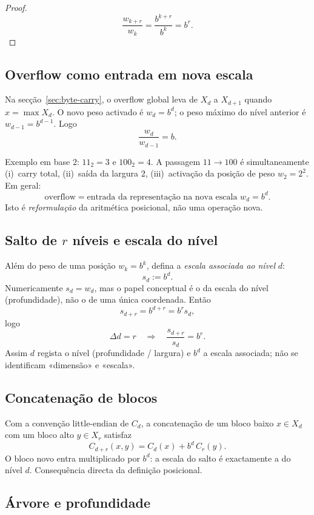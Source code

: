 \documentclass[11pt,a4paper]{article}
\begin{document}
\begin{proof}
\[
\frac{w_{k+r}}{w_k}=\frac{b^{k+r}}{b^k}=b^r.
\]
\end{proof}

\subsection{Overflow como entrada em nova escala}

Na secção~\ref{sec:byte-carry}, o overflow global leva de \(X_d\) a \(X_{d+1}\) quando \(x=\max X_d\). O novo peso activado é \(w_d=b^d\); o peso máximo do nível anterior é \(w_{d-1}=b^{d-1}\). Logo
\[
\frac{w_d}{w_{d-1}}=b.
\]

Exemplo em base \(2\): \(11_2=3\) e \(100_2=4\). A passagem \(11\to 100\) é simultaneamente (i)~carry total, (ii)~saída da largura \(2\), (iii)~activação da posição de peso \(w_2=2^2\). Em geral:
\[
\boxed{\text{overflow}=\text{entrada da representação na nova escala }w_d=b^d}.
\]
Isto é \emph{reformulação} da aritmética posicional, não uma operação nova.

\subsection{Salto de \(r\) níveis e escala do nível}

Além do peso de uma posição \(w_k=b^k\), defina a \emph{escala associada ao nível} \(d\):
\[
s_d:=b^d.
\]
Numericamente \(s_d=w_d\), mas o papel conceptual é o da escala do nível (profundidade), não o de uma única coordenada. Então
\[
s_{d+r}=b^{d+r}=b^r s_d,
\]
logo
\[
\boxed{\Delta d=r\quad\Longrightarrow\quad\frac{s_{d+r}}{s_d}=b^r}.
\]
Assim \(d\) regista o nível (profundidade / largura) e \(b^d\) a escala associada; não se identificam «dimensão» e «escala».

\subsection{Concatenação de blocos}

Com a convenção little-endian de \(C_d\), a concatenação de um bloco baixo \(x\in X_d\) com um bloco alto \(y\in X_r\) satisfaz
\[
C_{d+r}(x,y)=C_d(x)+b^d\,C_r(y).
\]
O bloco novo entra multiplicado por \(b^d\): a escala do salto é exactamente a do nível \(d\). Consequência directa da definição posicional.

\subsection{Árvore e profundidade}
\end{document}
